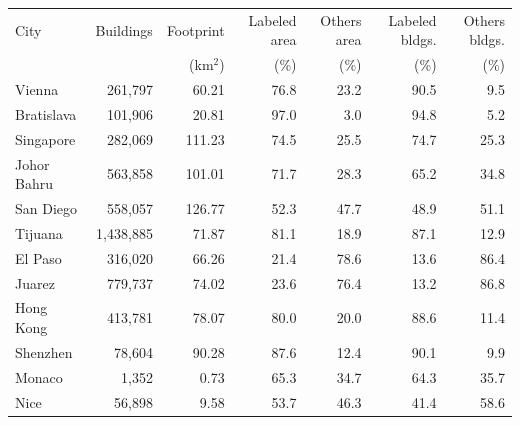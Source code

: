 \begin{tabular}{@{}lrrrrrr@{}}
\toprule
City & Buildings & Footprint & Labeled area & Others area & Labeled bldgs. & Others bldgs. \\
 & & (km$^2$) & (\%) & (\%) & (\%) & (\%) \\
\midrule
Vienna & 261,797 & 60.21 & 76.8 & 23.2 & 90.5 & 9.5 \\
Bratislava & 101,906 & 20.81 & 97.0 & 3.0 & 94.8 & 5.2 \\
Singapore & 282,069 & 111.23 & 74.5 & 25.5 & 74.7 & 25.3 \\
Johor Bahru & 563,858 & 101.01 & 71.7 & 28.3 & 65.2 & 34.8 \\
San Diego & 558,057 & 126.77 & 52.3 & 47.7 & 48.9 & 51.1 \\
Tijuana & 1,438,885 & 71.87 & 81.1 & 18.9 & 87.1 & 12.9 \\
El Paso & 316,020 & 66.26 & 21.4 & 78.6 & 13.6 & 86.4 \\
Juarez & 779,737 & 74.02 & 23.6 & 76.4 & 13.2 & 86.8 \\
Hong Kong & 413,781 & 78.07 & 80.0 & 20.0 & 88.6 & 11.4 \\
Shenzhen & 78,604 & 90.28 & 87.6 & 12.4 & 90.1 & 9.9 \\
Monaco & 1,352 & 0.73 & 65.3 & 34.7 & 64.3 & 35.7 \\
Nice & 56,898 & 9.58 & 53.7 & 46.3 & 41.4 & 58.6 \\
\bottomrule
\end{tabular}
